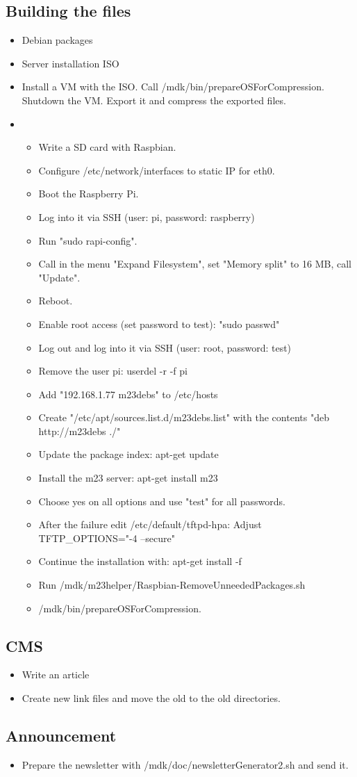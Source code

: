 \subsection{Building the files}
\begin{itemize}
\item Debian packages
\item Server installation ISO
\item Install a VM with the ISO. Call /mdk/bin/prepareOSForCompression. Shutdown the VM. Export it and compress the exported files.
\item
	\begin{itemize}
		\item Write a SD card with Raspbian.
		\item Configure /etc/network/interfaces to static IP for eth0.
		\item Boot the Raspberry Pi.
		\item Log into it via SSH (user: pi, password: raspberry)
		\item Run "sudo rapi-config".
		\item Call in the menu "Expand Filesystem", set "Memory split" to 16 MB, call "Update".
		\item Reboot.
		\item Enable root access (set password to test): "sudo passwd"
		\item Log out and log into it via SSH (user: root, password: test)
		\item Remove the user pi: userdel -r -f pi
		\item Add "192.168.1.77 m23debs" to /etc/hosts
		\item Create "/etc/apt/sources.list.d/m23debs.list" with the contents "deb http://m23debs ./"
		\item Update the package index: apt-get update
		\item Install the m23 server: apt-get install m23
		\item Choose yes on all options and use "test" for all passwords.
		\item After the failure edit /etc/default/tftpd-hpa: Adjust TFTP_OPTIONS="-4 --secure"
		\item Continue the installation with: apt-get install -f
		\item Run /mdk/m23helper/Raspbian-RemoveUnneededPackages.sh
		\item /mdk/bin/prepareOSForCompression.
	\end{itemize}
\end{itemize}


\subsection{CMS}
\begin{itemize}
\item Write an article
\item Create new link files and move the old to the old directories.
\end{itemize}


\subsection{Announcement}
\begin{itemize}
\item Prepare the newsletter with /mdk/doc/newsletterGenerator2.sh and send it.
\end{itemize}

